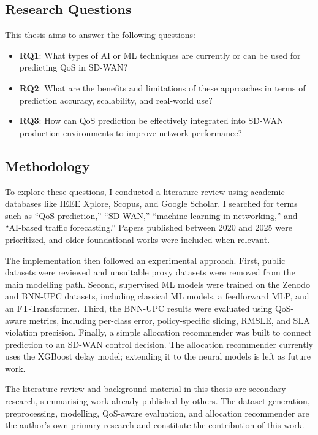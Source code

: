 \documentclass[a4paper,12pt]{Classes/RoboticsLaTeX}
\begin{document}
    \subsection*{Research Questions}
    
    This thesis aims to answer the following questions:
    \begin{itemize}
        \item \textbf{RQ1}: What types of AI or ML techniques are currently or can be used for predicting QoS in SD-WAN?
        \item \textbf{RQ2}: What are the benefits and limitations of these approaches in terms of prediction accuracy, scalability, and real-world use?
        \item \textbf{RQ3}: How can QoS prediction be effectively integrated into SD-WAN production environments to improve network performance?
    \end{itemize}
    
    \subsection*{Methodology}
    
    To explore these questions, I conducted a literature review using academic databases like IEEE Xplore, Scopus, and Google Scholar. I searched for terms such as “QoS prediction,” “SD-WAN,” “machine learning in networking,” and “AI-based traffic forecasting.” Papers published between 2020 and 2025 were prioritized, and older foundational works were included when relevant.

    The implementation then followed an experimental approach. First, public datasets were reviewed and unsuitable proxy datasets were removed from the main modelling path. Second, supervised ML models were trained on the Zenodo and BNN-UPC datasets, including classical ML models, a feedforward MLP, and an FT-Transformer. Third, the BNN-UPC results were evaluated using QoS-aware metrics, including per-class error, policy-specific slicing, RMSLE, and SLA violation precision. Finally, a simple allocation recommender was built to connect prediction to an SD-WAN control decision. The allocation recommender currently uses the XGBoost delay model; extending it to the neural models is left as future work.

    The literature review and background material in this thesis are secondary research, summarising work already published by others. The dataset generation, preprocessing, modelling, QoS-aware evaluation, and allocation recommender are the author's own primary research and constitute the contribution of this work.
    
\end{document}
